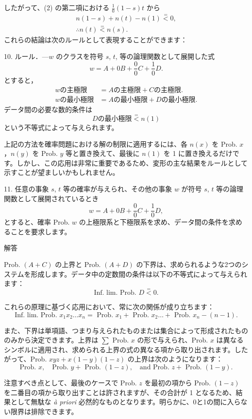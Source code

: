 \documentclass[a4paper,11pt,openany]{ltjsbook}
\begin{document}
したがって、(2) の第二項における $\frac{1}{0}(1-s)t$ から
\begin{gather*}
  n(1-s) + n(t) - n(1) \stackrel{=}{<} 0,   \\
  \therefore n(t) \stackrel{=}{<} n(s).
\end{gather*}
これらの結論は次のルールとして表現することができます：

10. ルール．---$w$ のクラスを符号 $s$, $t$, 等の論理関数として展開した式
\[
  w = A + 0B + \frac{0}{0}C + \frac{1}{0}D.
\]
とすると，
\begin{align*}
  w の主極限 &= A の主極限 + C の主極限.   \\
  w の最小極限 &= A の最小極限 + D の最小極限.
\end{align*}
データ間の必要な数的条件は
\[
  D の最小極限 \stackrel{=}{<} n(1)
\]
という不等式によって与えられます。

上記の方法を確率問題における解の制限に適用するには、各 $n(x)$ を Prob. $x$，$n(y)$ を Prob. $y$ 等と置き換えて、最後に $n(1)$ を 1 に置き換えるだけです。しかし、この応用は非常に重要であるため、変形の主な結果をルールとして示すことが望ましいかもしれません。

11. 任意の事象 $s$, $t$ 等の確率が与えられ、その他の事象 $w$ が符号 $s$, $t$ 等の論理関数として展開されているとき
\[
  w = A + 0B + \frac{0}{0}C + \frac{1}{0}D,
\]
とすると、確率 Prob. $w$ の上極限系と下極限系を求め、データ間の条件を求めることを要求します。

解答

Prob. $(A + C)$ の上界と Prob. $(A + D)$ の下界は、求められるような2つのシステムを形成します。データ中の定数間の条件は以下の不等式によって与えられます：
\[
  \text{Inf. lim. Prob. } D \stackrel{=}{<} 0.
\]

これらの原理に基づく応用において、常に次の関係が成り立ちます：
\[
  \text{Inf. lim. Prob. } x_1 x_2 \dotsc x_n = \text{ Prob. } x_1 + \text{ Prob. }x_2 \dotsc + \text{ Prob. }x_n - (n-1).
\]

また、下界は単項語、つまり与えられたものまたは集合によって形成されたもののみから決定できます。上界は $\sum \text{ Prob. } x$ の形で与えられ、Prob. $x$ は異なるシンボルに適用され、求められる上界の式の異なる項から取り出されます。したがって、Prob. $xyz + x(1-y)(1-z)$ の上界は次のようになります：
\[
  \text{Prob. }x, \quad \text{Prob. }y + \text{ Prob. }(1-z), \quad \text{and Prob. }z + \text{ Prob. }(1-y).
\]

注意すべき点として、最後のケースで Prob. $z$ を最初の項から Prob. $(1-z)$ を二番目の項から取り出すことは許されますが、その合計が 1 となるため、結果として無駄な \textit{\`{a} priori} 必然的なものとなります。明らかに、0と1の間に入らない限界は排除できます。
\end{document}
